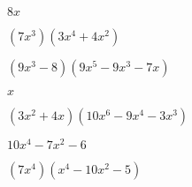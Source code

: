 \documentclass{article}
\begin{document}
\begin{multicols}{2}
$8x$\item $(7x^{3})(3x^{4}+4x^2)$\item $(9x^{3}-8)(9x^{5}-9x^{3}-7x)$\item $x$\item $(3x^2+4x)(10x^{6}-9x^{4}-3x^{3})$\item $10x^{4}-7x^2-6$\item $(7x^{4})(x^{4}-10x^2-5)$\ite
\end{multicols}
\end{document}
